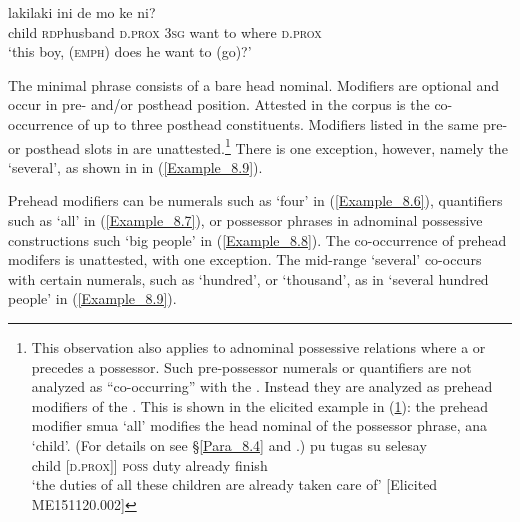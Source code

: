 \ea
\label{Example_8.5}
 {laki{\Tilde}laki} {ini} {de} {mo} {ke} {} {ni}?\\ %
 child  \textsc{rdp}{\Tilde}husband  \textsc{d.prox}  \textsc{3sg}  want  to  where  \textsc{d.prox}\\
\glt 
‘this boy,  (\textsc{emph}) does he want to (go)?’ \textstyleExampleSource{[080922-004-Cv.0017]}
\z



The minimal  phrase consists of a bare head nominal. Modifiers are optional and occur in pre- and/or posthead position. Attested in the corpus is the co-occurrence of up to three posthead constituents. Modifiers listed in the same pre- or posthead slots in 
 are unattested.\footnote{This observation also applies to adnominal possessive relations where a  or  precedes a possessor. Such pre-possessor numerals or quantifiers are not analyzed as “co-occurring” with the . Instead they are analyzed as prehead modifiers of the . This is shown in the elicited example in (\ref{Footnote_Example_8.1}): the prehead modifier smua ‘all’ modifies the head nominal of the possessor phrase, ana ‘child’. (For details on  see §\ref{Para_8.4} and .)
 \vspace{-5pt}
 \ea
 \label{Footnote_Example_8.1}
 \gll {}   pu tugas su selesay\\
 [[all] child [\textsc{d.prox}]] \textsc{poss} duty already finish\\
 \glt  ‘the duties of all these children are already taken care of’ [Elicited ME151120.002]
 \z
 } There is one exception, however, namely the   ‘several’, as shown in in (\ref{Example_8.9}).



Prehead modifiers can be numerals such as  ‘four’ in (\ref{Example_8.6}), quantifiers such as  ‘all’ in (\ref{Example_8.7}), or possessor  phrases in adnominal possessive constructions such  ‘big people’ in (\ref{Example_8.8}). The co-occurrence of prehead modifers is unattested, with one exception. The mid-range   ‘several’ co-occurs with certain numerals, such as  ‘hundred’, or  ‘thousand’, as in  ‘several hundred people’ in (\ref{Example_8.9}). 



